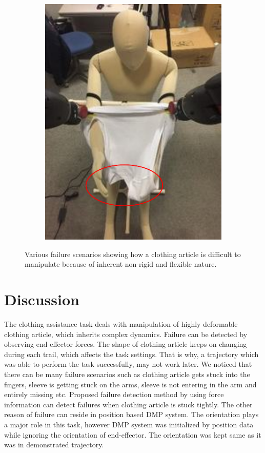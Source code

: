 \documentclass[sigconf]{acmart}
\begin{document}
\begin{figure}
\begin{subfigure}{.4\linewidth}
		\includegraphics[width=.98\linewidth]{failure_scenario_4}
	\end{subfigure}
	\caption{Various failure scenarios showing how a clothing article is difficult to manipulate because of inherent non-rigid and flexible nature.}
	\label{fig:failure_scenarios}
\end{figure}

\section{Discussion}
\label{sec:discussion}
The clothing assistance task deals with manipulation of highly deformable clothing article, which inherits complex dynamics. Failure can be detected by observing end-effector forces. The shape of clothing article keeps on changing during each trail, which affects the task settings. That is why, a trajectory which was able to perform the task successfully, may not work later. We noticed that there can be many failure scenarios such as clothing article gets stuck into the fingers, sleeve is getting stuck on the arms, sleeve is not entering in the arm and entirely missing etc. Proposed failure detection method by using force information can detect failures when clothing article is stuck tightly. The other reason of failure can reside in position based DMP system. The orientation plays a major role in this task, however DMP system was initialized by position data while ignoring the orientation of end-effector. The orientation was kept same as it was in demonstrated trajectory. 
\end{document}
